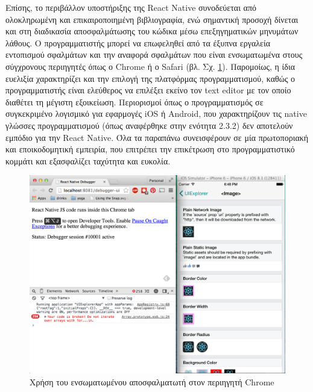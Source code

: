 Επίσης, το περιβάλλον υποστήριξης της React Native συνοδεύεται από ολοκληρωμένη και επικαιροποιημένη βιβλιογραφία, ενώ σημαντική προσοχή δίνεται και στη διαδικασία αποσφαλμάτωσης του κώδικα μέσω επεξηγηματικών μηνυμάτων λάθους. Ο προγραμματιστής μπορεί να επωφεληθεί από τα έξυπνα εργαλεία εντοπισμού σφαλμάτων και την αναφορά σφαλμάτων που είναι ενσωματωμένα στους σύγχρονους περιηγητές όπως ο Chrome ή ο Safari (βλ. Σχ. \ref{debugger}). Παρομοίως, η ίδια ευελιξία χαρακτηρίζει και την επιλογή της πλατφόρμας προγραμματισμού, καθώς ο προγραμματιστής είναι ελεύθερος να επιλέξει εκείνο τον text editor με τον οποίο διαθέτει τη μέγιστη εξοικείωση. Περιορισμοί όπως ο προγραμματισμός σε συγκεκριμένο λογισμικό για εφαρμογές iOS ή Android, που χαρακτηρίζουν τις native γλώσσες προγραμματισμού (όπως αναφέρθηκε στην ενότητα 2.3.2) δεν αποτελούν εμπόδιο για την React Native. Όλα τα παραπάνω συνεισφέρουν σε μία πρωτοποριακή και εποικοδομητική εμπειρία, που επιτρέπει την επικέτρωση στο προγραμματιστικό κομμάτι και εξασφαλίζει ταχύτητα και ευκολία.

\begin{figure}
    \centering
    \includegraphics[scale=0.9]{figures/using-react-native-debugger.png}
    \caption{Χρήση του ενσωματωμένου αποσφαλματωτή στον περιηγητή Chrome}
    \label{debugger}
\end{figure}

